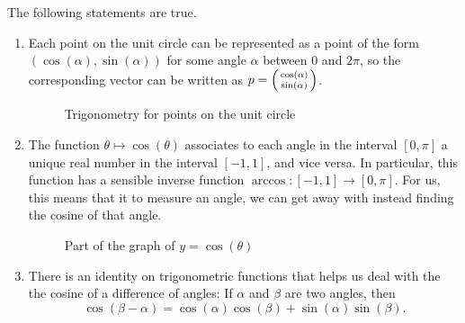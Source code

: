 \documentclass[elementsmain.tex]{subfiles}
\begin{document}
\begin{theorem}\label{thm:trig}
The following statements are true.
\begin{enumerate}
\item Each point on the unit circle can be represented as a point of the form $(\cos(\alpha), \sin(\alpha))$ for some angle $\alpha$ between $0$ and $2\pi$, so the corresponding vector can be written as $p = \left(\begin{smallmatrix} \cos(\alpha) \\ \sin(\alpha) \end{smallmatrix}\right)$.


\begin{figure}[h]
\centering
{}
\caption{Trigonometry for points on the unit circle}
\label{fig:unit-circle}
\end{figure}


\item The function $\theta \mapsto \cos(\theta)$ associates to each angle in the interval
$[0,\pi]$ a unique real number in the interval $[-1,1]$, and vice versa.  In particular, this function has a sensible inverse function $\arccos: [-1,1]\rightarrow [0,\pi]$. For us, this means that it to measure an angle, we can get away with instead finding the cosine of that angle.

\begin{figure}[h]
\centering
{}
\caption{Part of the graph of $y=\cos(\theta)$}
\label{fig:cos-graph}
\end{figure}

\item There is an identity on trigonometric functions that helps us deal with the the cosine of a difference of angles: If $\alpha$ and $\beta$ are two angles, then
\[
\cos(\beta-\alpha) = \cos(\alpha)\cos(\beta) + \sin(\alpha)\sin(\beta).
\]
\end{enumerate}
\end{theorem}
\end{document}
